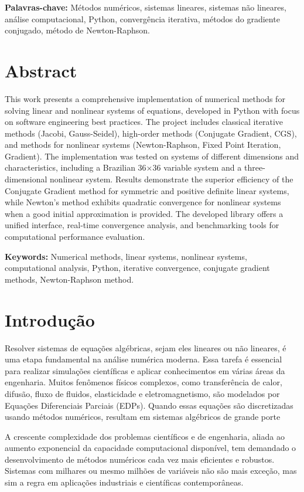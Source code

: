 \documentclass[12pt,a4paper]{article}
\begin{document}
\textbf{Palavras-chave:} Métodos numéricos, sistemas lineares, sistemas não lineares, análise computacional, Python, convergência iterativa, métodos do gradiente conjugado, método de Newton-Raphson.

\section{Abstract}

This work presents a comprehensive implementation of numerical methods for solving linear and nonlinear systems of equations, developed in Python with focus on software engineering best practices. The project includes classical iterative methods (Jacobi, Gauss-Seidel), high-order methods (Conjugate Gradient, CGS), and methods for nonlinear systems (Newton-Raphson, Fixed Point Iteration, Gradient). The implementation was tested on systems of different dimensions and characteristics, including a Brazilian 36×36 variable system and a three-dimensional nonlinear system. Results demonstrate the superior efficiency of the Conjugate Gradient method for symmetric and positive definite linear systems, while Newton's method exhibits quadratic convergence for nonlinear systems when a good initial approximation is provided. The developed library offers a unified interface, real-time convergence analysis, and benchmarking tools for computational performance evaluation.

\textbf{Keywords:} Numerical methods, linear systems, nonlinear systems, computational analysis, Python, iterative convergence, conjugate gradient methods, Newton-Raphson method.


\section{Introdução}

Resolver sistemas de equações algébricas, sejam eles lineares ou não lineares, é uma etapa fundamental na análise numérica moderna. Essa tarefa é essencial para realizar simulações científicas e aplicar conhecimentos em várias áreas da engenharia. Muitos fenômenos físicos complexos, como transferência de calor, difusão, fluxo de fluidos, elasticidade e eletromagnetismo, são modelados por Equações Diferenciais Parciais (EDPs). Quando essas equações são discretizadas usando métodos numéricos, resultam em sistemas algébricos de grande porte \citep{GOLUB2013}

A crescente complexidade dos problemas científicos e de engenharia, aliada ao aumento exponencial da capacidade computacional disponível, tem demandado o desenvolvimento de métodos numéricos cada vez mais eficientes e robustos. Sistemas com milhares ou mesmo milhões de variáveis não são mais exceção, mas sim a regra em aplicações industriais e científicas contemporâneas.
\end{document}
